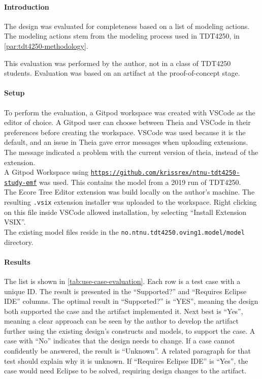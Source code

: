 
\paragraph{Introduction}
The design was evaluated for completeness based on a list of modeling actions.
The modeling actions stem from the modeling process used in \gls{TDT4250}, in \cref{par:tdt4250-methodology}.

This evaluation was performed by the author, not in a class of \gls{TDT4250} students.
Evaluation was based on an artifact at the proof-of-concept stage.\\

\paragraph{Setup}
To perform the evaluation, a \gls{Gitpod} workspace was created with \gls{VSCode} as the editor of choice.
A \gls{Gitpod} user can choose between \gls{Theia} and \gls{VSCode} in their preferences before creating the workspace.
\Gls{VSCode} was used because it is the default, and an issue in Theia gave error messages when uploading extensions.
The message indicated a problem with the current version of theia, instead of the extension.\\

A \gls{Gitpod} Workspace using \href{https://github.com/krissrex/ntnu-tdt4250-study-emf}{\nolinkurl{https://github.com/krissrex/ntnu-tdt4250-study-emf}} was used.
This contains the model from a 2019 run of \gls{TDT4250}.\\

The Ecore Tree Editor extension was build locally on the author's machine.
The resulting \texttt{.vsix} extension installer was uploaded to the workspace.
Right clicking on this file inside \gls{VSCode} allowed installation, by selecting ``Install Extension VSIX''.\\

The existing model files reside in the \lstinline{no.ntnu.tdt4250.oving1.model/model} directory.


\paragraph{Results}
The list is shown in \cref{tab:use-case-evaluation}.
Each row is a test case with a unique ID.
The result is presented in the ``Supported?'' and ``Requires Eclipse IDE'' columns.
The optimal result in ``Supported?'' is ``YES'', meaning the design both supported the case and the artifact implemented it.
Next best is ``Yes'', meaning a clear approach can be seen by the author to develop the artifact further using the existing design's constructs and models, to support the case.
A case with ``No'' indicates that the design needs to change.
If a case cannot confidently be answered, the result is ``Unknown''.
A related paragraph for that test should explain why it is unknown.
If ``Requires Eclipse IDE'' is ``Yes'', the case would need \gls{Eclipse} to be solved, requiring design changes to the artifact.

